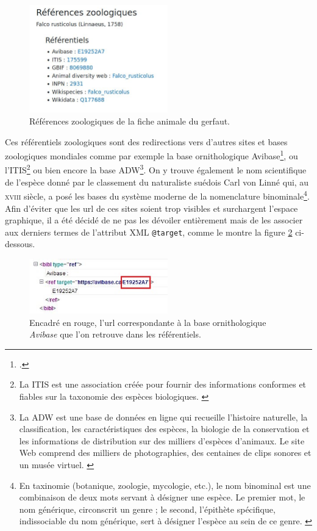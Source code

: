 \documentclass[a4paper,12pt,twoside]{book}
\begin{document}
\begin{figure}[H]
    \centering
    \includegraphics[width=6cm]{img/partie_3/ref_zoo.JPG}
    \caption{Références zoologiques de la fiche animale du gerfaut.}
    \label{ref_zoo}
\end{figure}

Ces référentiels zoologiques sont des redirections vers d'autres sites et bases zoologiques mondiales comme par exemple la base ornithologique Avibase\footcite{avibase}, ou l'\acrfull{ITIS}\footnote{La ITIS est une association créée pour fournir des informations conformes et fiables sur la taxonomie des espèces biologiques. \cite{taxonomie}} ou bien encore la base \acrfull{ADW}\footnote{La ADW est une base de données en ligne qui recueille l'histoire naturelle, la classification, les caractéristiques des espèces, la biologie de la conservation et les informations de distribution sur des milliers d'espèces d'animaux. Le site Web comprend des milliers de photographies, des centaines de clips sonores et un musée virtuel. \cite{adw}}. On y trouve également le nom scientifique de l'espèce donné par le classement du naturaliste suédois Carl von Linné qui, au \textsc{xviii}\ieme{} siècle, a posé les bases du système moderne de la nomenclature binominale\footnote{En taxinomie (botanique, zoologie, mycologie, etc.), le nom binominal est une combinaison de deux mots servant à désigner une espèce. Le premier mot, le nom générique, circonscrit un genre ; le second, l'épithète spécifique, indissociable du nom générique, sert à désigner l'espèce au sein de ce genre. \cite{binomial}}. Afin d'éviter que les url de ces sites soient trop visibles et surchargent l'espace graphique, il a été décidé de ne pas les dévoiler entièrement mais de les associer aux derniers termes de l'attribut XML \texttt{@target}, comme le montre la figure \ref{url} ci-dessous.

\begin{figure}[H]
    \centering
    \includegraphics[width=6cm]{img/partie_3/zoo_xml.JPG}
    \caption{Encadré en rouge, l'url correspondante à la base ornithologique \textit{Avibase} que l'on retrouve dans les référentiels.
    }
    \label{url}
\end{figure}
\end{document}
